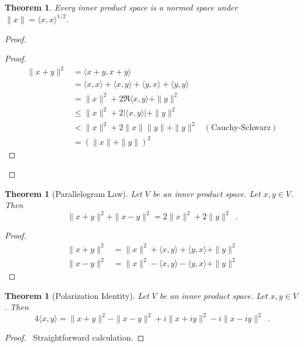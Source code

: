 \documentclass{book}
\let\qed\relax
\newtheorem{thm}[ax]{Theorem}
\theoremstyle{definition}
\begin{document}
\begin{thm}
Every inner product space is a normed space under $\| x \| = \langle x,x \rangle^{1/2}$.
\end{thm}

\begin{proof}
\pf
{}
\begin{proof}
	\pf
	\begin{align*}
		\| x + y \|^2 & = \langle x + y, x + y \rangle \\		
		& = \langle x,x \rangle + \langle x,y \rangle + \langle y,x \rangle + \langle y,y \rangle \\
		& = \| x \|^2 + 2 \Re \langle x,y \rangle + \| y \|^2 \\
		& \leq \| x \|^2 + 2 |\langle x,y \rangle| + \| y \|^2 \\
		& < \| x \|^2 + 2 \|x\| \|y\| + \|y\|^2 & (\text{Cauchy-Schwarz}) \\
		& = (\|x\| + \|y\|)^2
	\end{align*}
\end{proof}
\qed
\end{proof}

\begin{thm}[Parallelogram Law]
Let $V$ be an inner product space. Let $x,y \in V$. Then
\[ \| x + y \|^2 + \| x - y \|^2 = 2 \| x \|^2 + 2 \| y \|^2 \enspace . \]
\end{thm}

\begin{proof}
	\pf
	\begin{align*}
		\| x + y\|^2 & = \| x\|^2 + \langle x,y \rangle + \langle y,x \rangle + \| y\|^2 \\
		\| x - y \|^2 & = \| x\|^2 - \langle x,y \rangle - \langle y,x \rangle + \| y \|^2
	\end{align*}
\end{proof}

\begin{thm}[Polarization Identity]
Let $V$ be an inner product space. Let $x,y \in V$. Then
\[ 4 \langle x,y \rangle = \| x + y \|^2 - \| x - y \|^2 + i \| x + i y \|^2 - i \| x - iy \|^2 \enspace . \]
\end{thm}

\begin{proof}
	\pf\ Straightforward calculation. \qed
\end{proof}
\end{document}
